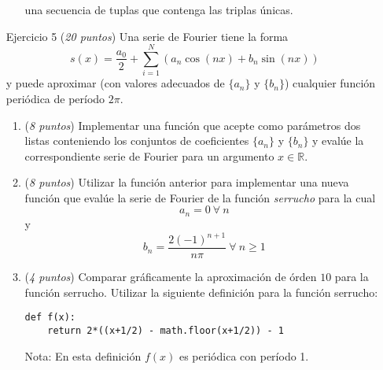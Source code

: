 \documentclass[a4paper,12pt]{article}
\begin{document}
\begin{enumerate}
\begin{enumerate}
        una secuencia de tuplas que contenga las triplas únicas.
    \end{enumerate}
    \item[Ejercicio 5] ({\em 20 puntos}) Una serie de Fourier tiene la forma
    $$s(x) = \frac{a_0}{2}+\sum_{i=1}^N \left( a_n \cos(nx) + b_n \sin(nx) \right)$$
    y puede aproximar (con valores adecuados de $\{a_n\}$ y $\{b_n\}$) cualquier función
    periódica de período $2\pi$.
    \begin{enumerate}
        \item ({\em 8 puntos}) Implementar una función que acepte como parámetros dos listas conteniendo los conjuntos de coeficientes $\{a_n\}$ y $\{b_n\}$ y evalúe la correspondiente serie de Fourier para un argumento $x\in \mathbb{R}$.
        \item ({\em 8 puntos}) Utilizar la función anterior para implementar una nueva función que evalúe la serie de Fourier de la función {\em serrucho} para la
        cual 
        $$a_n = 0\ \forall\ n$$
        y
        $$b_n = \frac{2(-1)^{n+1}}{n \pi}\ \forall\ n\ge 1$$
        \item ({\em 4 puntos}) Comparar gráficamente la aproximación de órden $10$ para la función serrucho. 
        Utilizar la siguiente definición para la función serrucho:
        \begin{verbatim}
def f(x):
    return 2*((x+1/2) - math.floor(x+1/2)) - 1   
        \end{verbatim}
        Nota: En esta definición $f(x)$ es periódica con período 1.
    \end{enumerate}
\end{enumerate}
\end{document}
